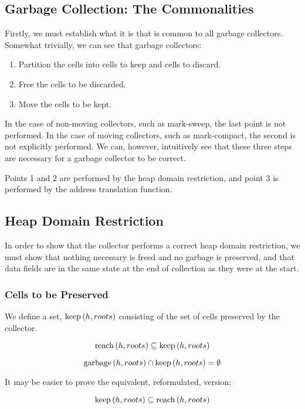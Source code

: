 \subsection{Garbage Collection: The Commonalities}

Firstly, we must establish what it is that is common to all
\glspl{garbage collector}. Somewhat trivially, we can see that
\glspl{garbage collector}:

\begin{enumerate}
  \item Partition the \glspl{cell} into cells to keep and cells to
    discard.
  \item Free the cells to be discarded.
  \item Move the cells to be kept.
\end{enumerate}

In the case of non-moving collectors, such as mark-sweep, the last
point is not performed. In the case of moving collectors, such as
mark-compact, the second is not explicitly performed. We can, however,
intuitively see that these three steps are necessary for a garbage
collector to be correct.

Points 1 and 2 are performed by the \gls{heap} domain restriction, and
point 3 is performed by the address translation function.

\subsection{Heap Domain Restriction}

In order to show that the \gls{collector} performs a correct
\gls{heap} domain restriction, we must show that nothing necessary is
freed and no garbage is preserved, and that data fields are
in the same state at the end of collection as they were at the start.

\subsubsection{Cells to be Preserved}

We define a set, $\mathrm{keep}\left(h, roots\right)$ consisting of the set of
\glspl{cell} preserved by the collector.

\begin{lemma}
  \[\mathrm{reach}\left(h, roots\right) \subseteq \mathrm{keep}\left(h, roots\right)\]
\end{lemma}

\begin{lemma}
  \[\mathrm{garbage}\left(h, roots\right) \cap \mathrm{keep}\left(h, roots\right) = \emptyset\]

  It may be easier to prove the equivalent, reformulated, version:

  \[\mathrm{keep}\left(h, roots\right) \subseteq \mathrm{reach}\left(h, roots\right)\]
\end{lemma}

